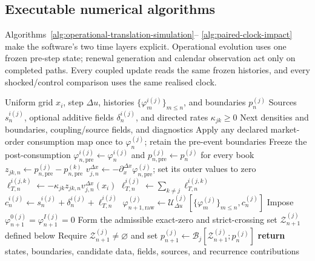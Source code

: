 
\subsection{Executable numerical algorithms}
\label{app:numerical-algorithms}

Algorithms~\ref{alg:operational-translation-simulation}--
\ref{alg:paired-clock-impact} make the software's two time layers explicit.
Operational evolution uses one frozen pre-step state; renewal generation and
calendar observation act only on completed paths.  Every coupled update reads
the same frozen histories, and every shocked/control comparison uses the same
realised clock.

\begin{algorithm}[H]
\caption{Coupled operational-time reaction-boundary evolution}
\label{alg:operational-translation-simulation}
\begin{algorithmic}[1]
\Require Uniform grid $x_i$, step $\Delta u$, histories
$\{\varphi_m^{i(j)}\}_{m\leq n}$, and boundaries $p_n^{(j)}$
\Require Sources $s_n^{i(j)}$, optional additive fields $\delta_n^{i(j)}$, and directed
rates $\kappa_{jk}\geq0$
\Ensure Next densities and boundaries, coupling/source fields, and diagnostics
\State Apply any declared market-order consumption map once to $\varphi_n^{(j)}$; retain the pre-event boundaries
\State Freeze the post-consumption $\varphi_{n,\mathrm{pre}}^{i(j)}\gets\varphi_n^{i(j)}$ and
$p_{n,\mathrm{pre}}^{(j)}\gets p_n^{(j)}$ for every book
  \State $z_{jk,n}\gets p_{n,\mathrm{pre}}^{(j)}-p_{n,\mathrm{pre}}^{(k)}$
  \State $v_{j,n}^{\Delta x}\gets-\partial_x^{\Delta x}
  \varphi_{n,\mathrm{pre}}^{(j)}$; set its outer values to zero
  \State $\ell_{T,n}^{i(j,k)}\gets-\kappa_{jk}z_{jk,n}
  v_{j,n}^{\Delta x}(x_i)$
\EndFor
{}
  \State $\ell_{T,n}^{i(j)}\gets\sum_{k\ne j}\ell_{T,n}^{i(j,k)}$
  \State $c_n^{i(j)}\gets s_n^{i(j)}+\delta_n^{i(j)}+
  \ell_{T,n}^{i(j)}$
  \State $\varphi_{n+1,\mathrm{raw}}^{(j)}\gets
  \mathcal U_{\Delta u}^{(j)}[\{\varphi_m^{(j)}\}_{m\leq n},c_n^{(j)}]$
  \State Impose $\varphi_{n+1}^{0(j)}=\varphi_{n+1}^{I(j)}=0$
  \State Form the admissible exact-zero and strict-crossing set
  $\mathcal Z_{n+1}^{(j)}$ defined below
  \State Require $\mathcal Z_{n+1}^{(j)}\ne\varnothing$ and set
  $p_{n+1}^{(j)}\gets\mathcal B_j[\mathcal Z_{n+1}^{(j)};p_n^{(j)}]$
\EndFor
\State \textbf{return} states, boundaries, candidate data, fields, sources,
and recurrence contributions
\end{algorithmic}
\end{algorithm}

